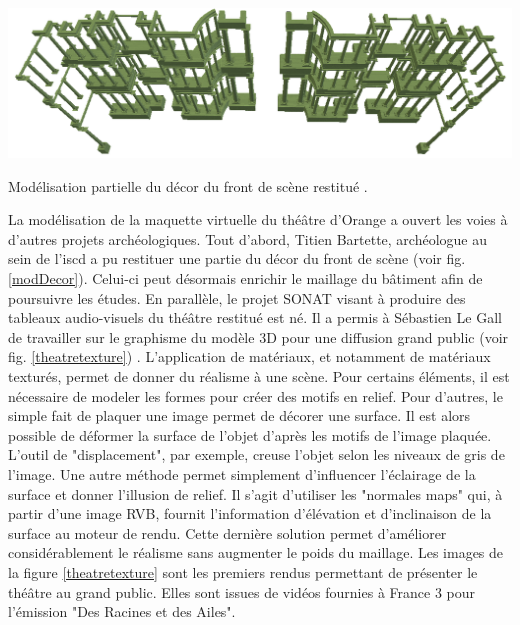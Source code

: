  \begin{figureth}
		\includegraphics[width=\linewidth]{images/modDecor}
	\caption[Modélisation partielle du décor du front de scène restitué.]{Modélisation partielle du décor du front de scène restitué \footnotemark.} 
	\label{modDecor}
\end{figureth}
La modélisation de la maquette virtuelle du théâtre d'Orange a ouvert les voies à d'au\-tres projets archéologiques. Tout d'abord, Titien Bartette, archéologue au sein de l'\gls{iscd} a pu restituer une partie du décor du front de scène (voir fig. \ref{modDecor}). Celui-ci peut désormais enrichir le maillage du bâtiment afin de poursuivre les études. En parallèle, le projet SONAT visant à produire des tableaux audio-visuels du théâtre restitué est né. Il a permis à Sébastien Le Gall de travailler sur le graphisme du modèle 3D pour une diffusion grand public (voir fig. \ref{theatretexture}) \cite[S. LeGall]{titien}. L'application de matériaux, et notamment de matériaux texturés, permet de donner du réalisme à une scène. Pour certains éléments, il est nécessaire de modeler les formes pour créer des motifs en relief. Pour d'autres, le simple fait de plaquer une image permet de décorer une surface. Il est alors possible de déformer la surface de l'objet d'après les motifs de l'image plaquée. L'outil de "displacement", par exemple, creuse l'objet selon les niveaux de gris de l'image. Une autre méthode permet simplement d'influencer l'éclairage de la surface et donner l'illusion de relief. Il s'agit d'utiliser les "normales maps" qui, à partir d'une image \gls{RVB}, fournit l'information d'élévation et d'inclinaison de la surface au moteur de rendu. Cette dernière solution permet d'améliorer considérablement le réalisme sans augmenter le poids du maillage. Les images de la figure \ref{theatretexture} sont les premiers rendus permettant de présenter le théâtre au grand public. Elles sont issues de vidéos fournies à France 3 pour l'émission "Des Racines et des Ailes".

